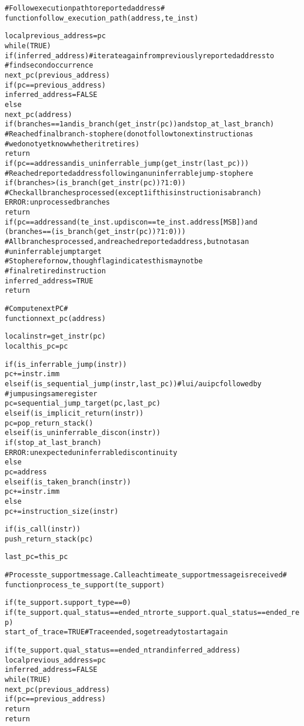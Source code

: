 \begin{alltt}
# Follow execution path to reported address #
function follow_execution_path(address, te_inst)

  local previous_address = pc
  while (TRUE)
    if (inferred_address) # iterate again from previously reported address to
                          #   find second occurrence
      next_pc(previous_address)
      if (pc == previous_address)
        inferred_address = FALSE
    else
      next_pc(address)
      if (branches == 1 and is_branch(get_instr(pc)) and stop_at_last_branch)
        # Reached final branch - stop here (do not follow to next instruction as
        #  we do not yet know whether it retires)
        return
      if (pc == address and is_uninferrable_jump(get_instr(last_pc)))
        # Reached reported address following an uninferrable jump - stop here
        if (branches > (is_branch(get_instr(pc)) ? 1 : 0))
          # Check all branches processed (except 1 if this instruction is a branch)
          ERROR: unprocessed branches
        return
      if (pc == address and (te_inst.updiscon == te_inst.address[MSB]) and
          (branches == (is_branch(get_instr(pc)) ? 1 : 0)))
            # All branches processed, and reached reported address, but not as an
            #   uninferrable jump target
            # Stop here for now, though flag indicates this may not be
            #  final retired instruction
        inferred_address = TRUE
        return
\end{alltt}

\pagebreak

\begin{alltt}
# Compute next PC #
function next_pc (address)

  local instr   = get_instr(pc)
  local this_pc = pc

  if (is_inferrable_jump(instr))
    pc += instr.imm
  else if (is_sequential_jump(instr, last_pc)) # lui/auipc followed by
                                               #  jump using same register
    pc = sequential_jump_target(pc, last_pc)
  else if (is_implicit_return(instr))
    pc = pop_return_stack()
  else if (is_uninferrable_discon(instr))
    if (stop_at_last_branch)
      ERROR: unexpected uninferrable discontinuity
    else
      pc = address
  else if (is_taken_branch(instr))
    pc += instr.imm
  else
    pc += instruction_size(instr)

  if (is_call(instr))
    push_return_stack(pc)

  last_pc = this_pc


# Process te_support message.  Call each time a te_support message is received #
function process_te_support (te_support)

  if (te_support.support_type == 0)
    if (te_support.qual_status == ended_ntr or te_support.qual_status == ended_rep)
      start_of_trace = TRUE # Trace ended, so get ready to start again

    if (te_support.qual_status == ended_ntr and inferred_address)
      local previous_address = pc
      inferred_address       = FALSE
      while (TRUE)
        next_pc(previous_address)
        if (pc == previous_address)
          return
  return
\end{alltt}

